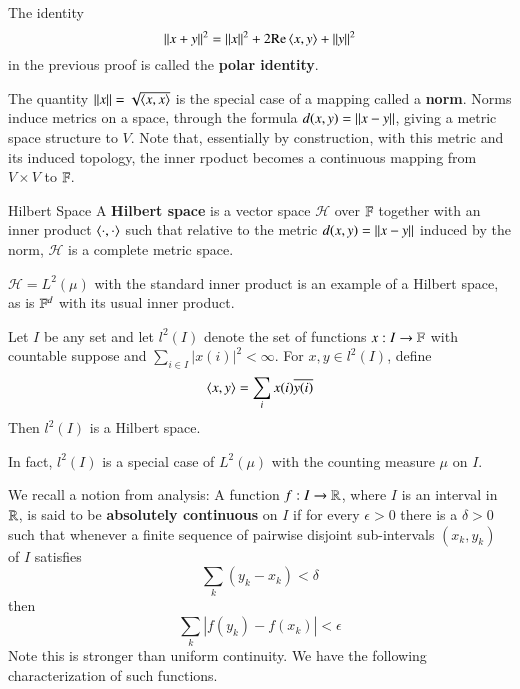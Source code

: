The identity $$\left|\left| x+y\right|\right|^2 = \left|\left| x\right|\right|^2+2\text{Re}\left\langle x, y\right\rangle+\left|\left| y\right|\right|^2$$
in the previous proof is called the \textbf{polar identity}.

The quantity $\left|\left| x\right|\right| = \sqrt{\left\langle x, x\right\rangle}$ is the special case of a mapping called a \textbf{norm}. Norms induce metrics on a space, through the formula $d(x,y) = \left|\left| x-y\right|\right|$, giving a metric space structure to $V$. Note that, essentially by construction, with this metric and its induced topology, the inner rpoduct becomes a continuous mapping from $V\times V$ to $\mathbb F$.

\begin{ndefn}{Hilbert Space}
    A \textbf{Hilbert space} is a vector space $\mathscr{H}$ over $\mathbb F$ together with an inner product $\left\langle \cdot, \cdot\right\rangle$ such that relative to the metric $d(x,y) = \left|\left| x-y\right|\right|$ induced by the norm, $\mathscr{H}$ is a complete metric space.
\end{ndefn}

$\mathscr{H} = L^2(\mu)$ with the standard inner product is an example of a Hilbert space, as is $\mathbb F^d$ with its usual inner product.

\begin{eg}
    Let $I$ be any set and let $l^2(I)$ denote the set of functions $x:I\rightarrow \mathbb F$ with countable suppose and $\sum_{i \in I}|x(i)|^2 < \infty$. For $x,y \in l^2(I)$, define $$\left\langle x, y\right\rangle = \sum_ix(i)\overline{y(i)}$$
    Then $l^2(I)$ is a Hilbert space.
\end{eg}

In fact, $l^2(I)$ is a special case of $L^2(\mu)$ with the counting measure $\mu$ on $I$.

We recall a notion from analysis: A function $f:I\rightarrow \mathbb R$, where $I$ is an interval in $\mathbb R$, is said to be \textbf{absolutely continuous} on $I$ if for every $\epsilon > 0$ there is a $\delta > 0$ such that whenever a finite sequence of pairwise disjoint sub-intervals $(x_k,y_k)$ of $I$ satisfies $$\sum_k(y_k-x_k) < \delta$$
then $$\sum_k|f(y_k)-f(x_k)| < \epsilon$$
Note this is stronger than uniform continuity. We have the following characterization of such functions.

